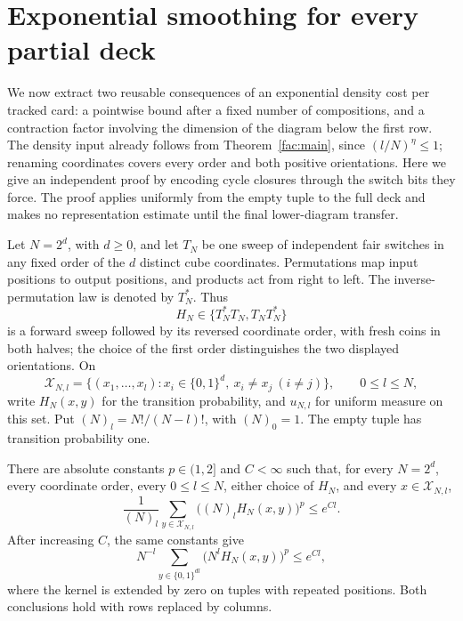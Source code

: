 \section{Exponential smoothing for every partial deck}
\label{n:strong-providers}

We now extract two reusable consequences of an exponential density
cost per tracked card: a pointwise bound after a fixed number of
compositions, and a contraction factor involving the dimension of
the diagram below the first row.  The density input already follows
from Theorem~\ref{fac:main}, since $(l/N)^\eta\le1$; renaming
coordinates covers every order and both positive orientations.
Here we give an independent proof by encoding cycle closures through
the switch bits they force.  The proof applies uniformly from the
empty tuple to the full deck and makes no representation estimate
until the final lower-diagram transfer.

Let $N=2^d$, with $d\ge0$, and let $T_N$ be one sweep of independent
fair switches in any fixed order of the $d$ distinct cube coordinates.
Permutations map input positions to output positions, and products
act from right to left.  The inverse-permutation law is denoted by
$T_N^*$.  Thus
\[
 H_N\in\{T_N^*T_N,T_NT_N^*\}
\]
is a forward sweep followed by its reversed coordinate order, with
fresh coins in both halves; the choice of the first order distinguishes
the two displayed orientations.  On
\[
 \mathcal X_{N,l}=\{(x_1,\ldots,x_l):x_i\in\{0,1\}^d,
                      \ x_i\ne x_j\ (i\ne j)\},
 \qquad 0\le l\le N,
\]
write $H_N(x,y)$ for the transition probability, and $u_{N,l}$ for
uniform measure on this set.  Put $(N)_l=N!/(N-l)!$, with $(N)_0=1$.
The empty tuple has transition probability one.

\begin{theorem}
\label{n:strong-density}
There are absolute constants $p\in(1,2]$ and $C<\infty$ such that,
for every $N=2^d$, every coordinate order, every $0\le l\le N$,
either choice of $H_N$, and every $x\in\mathcal X_{N,l}$,
\begin{equation}\label{n:strong-injection-density}
 \frac1{(N)_l}\sum_{y\in\mathcal X_{N,l}}
       \big((N)_lH_N(x,y)\big)^p\le e^{Cl}.
\end{equation}
After increasing $C$, the same constants give
\begin{equation}\label{n:strong-density-power-normalization}
 N^{-l}\sum_{y\in\{0,1\}^{dl}}
       \big(N^lH_N(x,y)\big)^p\le e^{Cl},
\end{equation}
where the kernel is extended by zero on tuples with repeated positions.
Both conclusions hold with rows replaced by columns.
\end{theorem}

